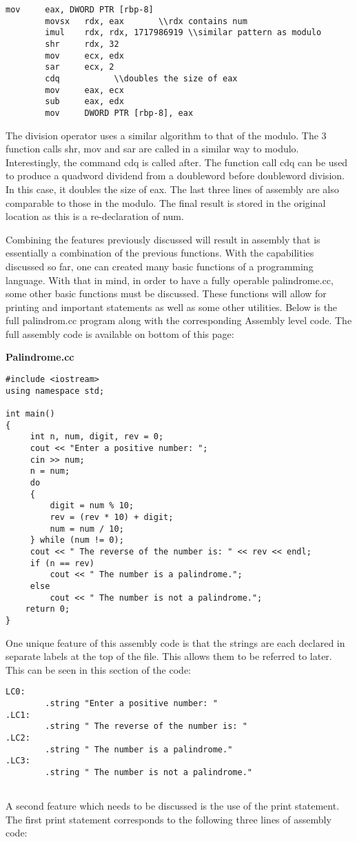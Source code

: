 \documentclass{article}
\theoremstyle{theorem}
\theoremstyle{definition}
\theoremstyle{remark}
\begin{document}
\begin{lstlisting}
mov     eax, DWORD PTR [rbp-8] 
        movsx   rdx, eax       \\rdx contains num
        imul    rdx, rdx, 1717986919 \\similar pattern as modulo
        shr     rdx, 32
        mov     ecx, edx
        sar     ecx, 2
        cdq           \\doubles the size of eax
        mov     eax, ecx
        sub     eax, edx
        mov     DWORD PTR [rbp-8], eax
\end{lstlisting}
The division operator uses a similar algorithm to that of the modulo.  The 3 function calls shr, mov and sar are called in a similar way to modulo. Interestingly, the command cdq is called after. The function call cdq can be used to produce a quadword dividend from a doubleword before doubleword division. In this case, it doubles the size of eax. The last three lines of assembly are also comparable to those in the modulo. The final result is stored in the original location as this is a re-declaration of num.

Combining the features previously discussed will result in assembly that is essentially a combination of the previous functions. With the capabilities discussed so far, one can created many basic functions of a programming language. With that in mind, in order to have a fully operable palindrome.cc, some other basic functions must be discussed. These functions will allow for printing and important statements as well as some other utilities. Below is the full palindrom.cc program along with the corresponding Assembly level code. The full assembly code is available on bottom of this page:



\medskip\noindent
\textbf{Palindrome.cc}
\begin{lstlisting}
#include <iostream>
using namespace std;

int main()
{
     int n, num, digit, rev = 0;
     cout << "Enter a positive number: ";
     cin >> num;
     n = num;
     do
     {
         digit = num % 10;
         rev = (rev * 10) + digit;
         num = num / 10;
     } while (num != 0);
     cout << " The reverse of the number is: " << rev << endl;
     if (n == rev)
         cout << " The number is a palindrome.";
     else
         cout << " The number is not a palindrome.";
    return 0;
}
\end{lstlisting}

One unique feature of this assembly code is that the strings are each declared in separate labels at the top of the file. This allows them to be referred to later. This can be seen in this section of the code:
\begin{lstlisting}
LC0:
        .string "Enter a positive number: "
.LC1:
        .string " The reverse of the number is: "
.LC2:
        .string " The number is a palindrome."
.LC3:
        .string " The number is not a palindrome."
        
\end{lstlisting}
A second feature which needs to be discussed is the use of the print statement. The first print statement corresponds to the following three lines of assembly code:
\end{document}
